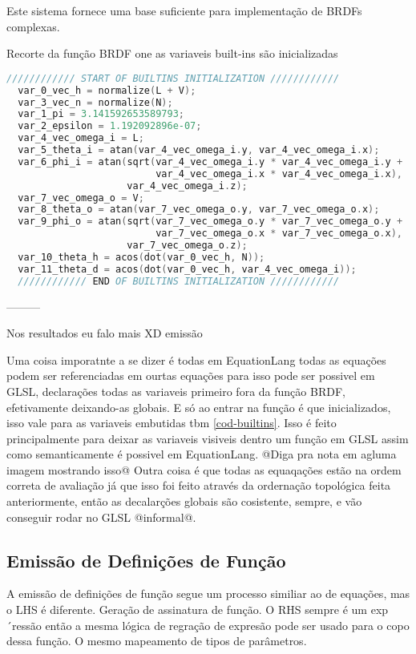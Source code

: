Este sistema fornece uma base suficiente para implementação de BRDFs complexas. 
\begin{codigo}[htb]
    \caption{\small Recorte da função BRDF one as variaveis built-ins são inicializadas }
    \label{cod-builtins-emitted}
\begin{lstlisting}[language=C, frame=none, inputencoding=utf8]
  //////////// START OF BUILTINS INITIALIZATION ////////////
  var_0_vec_h = normalize(L + V);
  var_3_vec_n = normalize(N);
  var_1_pi = 3.141592653589793;
  var_2_epsilon = 1.192092896e-07;
  var_4_vec_omega_i = L;
  var_5_theta_i = atan(var_4_vec_omega_i.y, var_4_vec_omega_i.x);
  var_6_phi_i = atan(sqrt(var_4_vec_omega_i.y * var_4_vec_omega_i.y +
                          var_4_vec_omega_i.x * var_4_vec_omega_i.x),
                     var_4_vec_omega_i.z);
  var_7_vec_omega_o = V;
  var_8_theta_o = atan(var_7_vec_omega_o.y, var_7_vec_omega_o.x);
  var_9_phi_o = atan(sqrt(var_7_vec_omega_o.y * var_7_vec_omega_o.y +
                          var_7_vec_omega_o.x * var_7_vec_omega_o.x),
                     var_7_vec_omega_o.z);
  var_10_theta_h = acos(dot(var_0_vec_h, N));
  var_11_theta_d = acos(dot(var_0_vec_h, var_4_vec_omega_i));
  //////////// END OF BUILTINS INITIALIZATION ////////////
\end{lstlisting}
\end{codigo}




---------

Nos resultados eu falo mais XD emissão

Uma coisa imporatnte a se dizer é todas em EquationLang todas as equações podem ser referenciadas em ourtas equações para isso pode ser possivel em GLSL, declarações todas as variaveis primeiro fora da função BRDF, efetivamente deixando-as globais. E só ao entrar na função é que inicializados, isso vale para as variaveis embutidas tbm \autoref{cod-builtins}. Isso é feito principalmente para deixar as variaveis visiveis dentro um função em GLSL assim como semanticamente é possivel em EquationLang. @Diga pra nota em agluma imagem mostrando isso@ Outra coisa é que todas as equaqações estão na ordem correta de avaliação já que isso foi feito através da ordernação topológica feita anteriormente, então as decalarções globais são cosistente, sempre, e vão conseguir rodar no GLSL @informal@.

\subsection{Emissão de Definições de Função}
A emissão de definições de função segue um processo similiar ao de equações, mas o LHS é diferente. Geração de assinatura de função. O RHS sempre é um exp´ressão então a mesma lógica de regração de expresão pode ser usado para o copo dessa função. O mesmo mapeamento de tipos de parâmetros.


